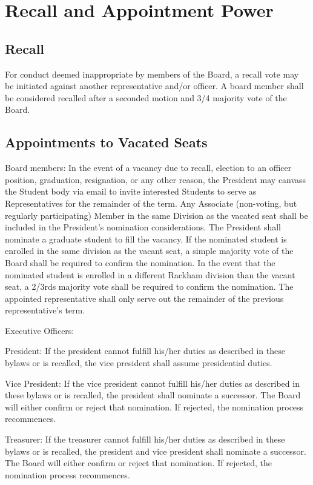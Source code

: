 \chapter{Recall and Appointment Power}
\section{Recall}For conduct deemed inappropriate by members of the Board, a recall 
vote may be initiated against another representative and/or officer. A board 
member shall be considered recalled after a seconded motion and 3/4 majority vote 
of the Board.

\section{Appointments to Vacated Seats}
\begin{enumsubsection}
\item{Board members}: In the event of a vacancy due to recall, election to an 
officer position, graduation, resignation, or any other reason, the President
may canvass the Student body via email to invite interested Students to serve 
as Representatives for the remainder of the term. Any Associate (non-voting, 
but regularly participating) Member in the same Division as the vacated seat 
shall be included in the President's nomination considerations. The President 
shall nominate a graduate student to fill the vacancy. If the nominated student 
is enrolled in the same division as the vacant seat, a simple majority vote of 
the Board shall be required to confirm the nomination. In the event that the 
nominated student is enrolled in a different Rackham division than the vacant 
seat, a 2/3rds majority vote shall be required to confirm the nomination. The 
appointed representative shall only serve out the remainder of the previous 
representative's term. 
\item{Executive Officers}:
\begin{enumsubsubsection}
\item{President}: If the president cannot fulfill his/her duties as described in 
these bylaws or is recalled, the vice president shall assume 
presidential duties. 
\item{Vice President}: If the vice president cannot fulfill his/her duties as 
described in these bylaws or is recalled, the president shall 
nominate a successor. The Board will either confirm or reject that 
nomination. If rejected, the nomination process recommences. 
\item{Treasurer}: If the treasurer cannot fulfill his/her duties as described 
in these bylaws or is recalled, the president and vice president 
shall nominate a successor. The Board will either confirm or 
reject that nomination. If rejected, the nomination process 
recommences. 
\end{enumsubsubsection}
\end{enumsubsection}